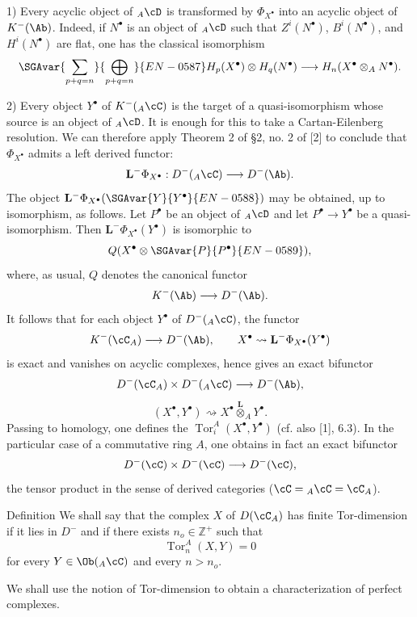 1) Every acyclic object of ${}_A\cD$ is transformed by $\Phi_{X^\bullet}$ into an acyclic object of $K^-(\Ab)$. Indeed, if $N^\bullet$ is an object of ${}_A\cD$ such that $Z^i(N^\bullet)$, $B^i(N^\bullet)$, and $H^i(N^\bullet)$ are flat, one has the classical isomorphism
\[
\SGAvar{\sum_{p+q=n}}{\bigoplus_{p+q=n}}{EN-0587}H_p(X^\bullet)\otimes H_q(N^\bullet)
\longrightarrow H_n(X^\bullet\otimes_A N^\bullet).
\]

2) Every object $Y^\bullet$ of $K^-({}_A\cC)$ is the target of a quasi-isomorphism whose source is an object of ${}_A\cD$. It is enough for this to take a Cartan-Eilenberg resolution. We can therefore apply Theorem 2 of §2, no. 2 of [2] to conclude that $\Phi_{X^\bullet}$ admits a left derived functor:
\[
\mathbf L^{-}\Phi_{X^\bullet}:D^-({}_A\cC)\longrightarrow D^-(\Ab).
\]
The object $\mathbf L^{-}\Phi_{X^\bullet}(\SGAvar{Y}{Y^\bullet}{EN-0588})$ may be obtained, up to isomorphism, as follows. Let $P^\bullet$ be an object of ${}_A\cD$ and let $P^\bullet\to Y^\bullet$ be a quasi-isomorphism. Then $\mathbf L^{-}\Phi_{X^\bullet}(Y^\bullet)$ is isomorphic to
\[
Q(X^\bullet\otimes \SGAvar{P}{P^\bullet}{EN-0589}),
\]
where, as usual, $Q$ denotes the canonical functor
\[
K^-(\Ab)\longrightarrow D^-(\Ab).
\]
It follows that for each object $Y^\bullet$ of $D^-({}_A\cC)$, the functor
\[
K^-(\cC_A)\longrightarrow D^-(\Ab),\qquad
X^\bullet\rightsquigarrow \mathbf L^{-}\Phi_{X^\bullet}(Y^\bullet)
\]
is exact and vanishes on acyclic complexes, hence gives an exact bifunctor
\[
D^-(\cC_A)\times D^-({}_A\cC)\longrightarrow D^-(\Ab),
\]
\[
(X^\bullet,Y^\bullet)\rightsquigarrow X^\bullet\overset{\mathbf L}{\otimes}_A Y^\bullet.
\]
Passing to homology, one defines the $\operatorname{Tor}_i^A(X^\bullet,Y^\bullet)$ (cf. also [1], 6.3). In the particular case of a commutative ring $A$, one obtains in fact an exact bifunctor
\[
D^-(\cC)\times D^-(\cC)\longrightarrow D^-(\cC),
\]
the tensor product in the sense of derived categories ($\cC={}_A\cC=\cC_A$).

\begin{statement}{Definition}
We shall say that the complex $X$ of $D(\cC_A)$ has finite Tor-dimension if it lies in $D^-$ and if there exists $n_o\in\mathbb Z^+$ such that
\[
\operatorname{Tor}_n^A(X,Y)=0
\]
for every $Y\in\Ob({}_A\cC)$ and every $n>n_o$.
\end{statement}

We shall use the notion of Tor-dimension to obtain a characterization of perfect complexes.

